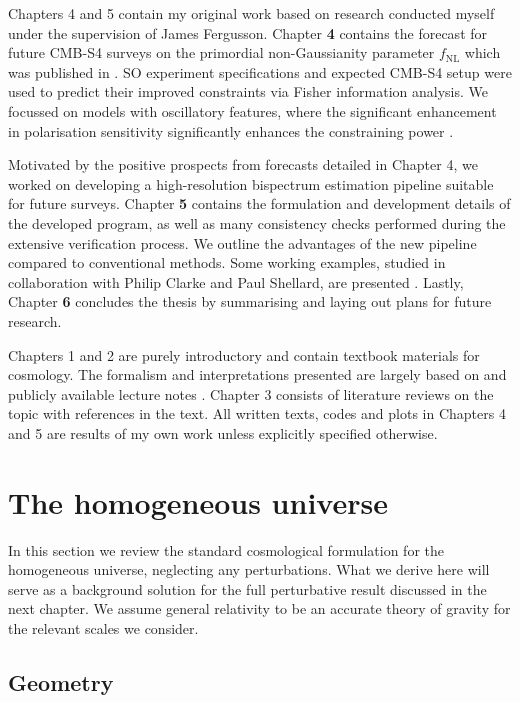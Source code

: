 Chapters 4 and 5 contain my original work based on research conducted myself under the supervision of James Fergusson. Chapter \textbf{4} contains the forecast for future CMB-S4 surveys on the primordial non-Gaussianity parameter $f_\text{NL}$ which was published in \cite{Sohn2019}. SO experiment specifications and expected CMB-S4 setup were used to predict their improved constraints via Fisher information analysis. We focussed on models with oscillatory features, where the significant enhancement in polarisation sensitivity significantly enhances the constraining power \cite{PlanckCollaboration2015}.

Motivated by the positive prospects from forecasts detailed in Chapter 4, we worked on developing a high-resolution bispectrum estimation pipeline suitable for future surveys. Chapter \textbf{5} contains the formulation and development details of the developed program, as well as many consistency checks performed during the extensive verification process. We outline the advantages of the new pipeline compared to conventional methods. Some working examples, studied in collaboration with Philip Clarke and Paul Shellard, are presented \cite{Sohn2021inprep}. Lastly, Chapter \textbf{6} concludes the thesis by summarising and laying out plans for future research.

Chapters 1 and 2 are purely introductory and contain textbook materials for cosmology. The formalism and interpretations presented are largely based on \cite{Dodelson2003textbook} and publicly available lecture notes \cite{Fergusson2020cosmology,Challinor2009lecture,Baumann2018primordialNotes,Lim2012advancedCosmo}. Chapter 3 consists of literature reviews on the topic with references in the text. All written texts, codes and plots in Chapters 4 and 5 are results of my own work unless explicitly specified otherwise.


\section{The homogeneous universe}

In this section we review the standard cosmological formulation for the homogeneous universe, neglecting any perturbations. What we derive here will serve as a background solution for the full perturbative result discussed in the next chapter. We assume general relativity to be an accurate theory of gravity for the relevant scales we consider.

\subsection{Geometry}

